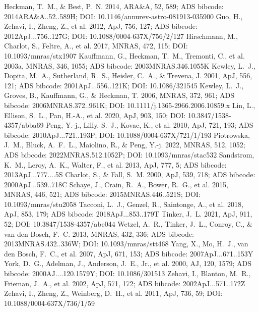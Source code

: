 \documentclass[twocolumn]{aastex631}
\begin{document}
\begin{thebibliography}{}
 Heckman, T.~M., \& Best, P.~N. 2014, ARA\&A, 52, 589; ADS bibcode: 2014ARA&A..52..589H; DOI: 10.1146/annurev-astro-081913-035900
 Guo, H., Zehavi, I., Zheng, Z., et al. 2012, ApJ, 756, 127; ADS bibcode: 2012ApJ...756..127G; DOI: 10.1088/0004-637X/756/2/127
 Hirschmann, M., Charlot, S., Feltre, A., et al. 2017, MNRAS, 472, 115; DOI: 10.1093/mnras/stx1907
 Kauffmann, G., Heckman, T.~M., Tremonti, C., et al. 2003a, MNRAS, 346, 1055; ADS bibcode: 2003MNRAS.346.1055K
 Kewley, L.~J., Dopita, M.~A., Sutherland, R.~S., Heisler, C.~A., \& Trevena, J. 2001, ApJ, 556, 121; ADS bibcode: 2001ApJ...556..121K; DOI: 10.1086/321545
 Kewley, L.~J., Groves, B., Kauffmann, G., \& Heckman, T. 2006, MNRAS, 372, 961; ADS bibcode: 2006MNRAS.372..961K; DOI: 10.1111/j.1365-2966.2006.10859.x
 Lin, L., Ellison, S.~L., Pan, H.-A., et al. 2020, ApJ, 903, 150; DOI: 10.3847/1538-4357/abba69
 Peng, Y.-j., Lilly, S.~J., Kovac, K., et al. 2010, ApJ, 721, 193; ADS bibcode: 2010ApJ...721..193P; DOI: 10.1088/0004-637X/721/1/193
 Piotrowska, J.~M., Bluck, A.~F.~L., Maiolino, R., \& Peng, Y.-j. 2022, MNRAS, 512, 1052; ADS bibcode: 2022MNRAS.512.1052P; DOI: 10.1093/mnras/stac532
 Sandstrom, K.~M., Leroy, A.~K., Walter, F., et al. 2013, ApJ, 777, 5; ADS bibcode: 2013ApJ...777....5S
 Charlot, S., \& Fall, S.~M. 2000, ApJ, 539, 718; ADS bibcode: 2000ApJ...539..718C
 Schaye, J., Crain, R.~A., Bower, R.~G., et al. 2015, MNRAS, 446, 521; ADS bibcode: 2015MNRAS.446..521S; DOI: 10.1093/mnras/stu2058
 Tacconi, L.~J., Genzel, R., Saintonge, A., et al. 2018, ApJ, 853, 179; ADS bibcode: 2018ApJ...853..179T
 Tinker, J.~L. 2021, ApJ, 911, 52; DOI: 10.3847/1538-4357/abe044
 Wetzel, A.~R., Tinker, J.~L., Conroy, C., \& van den Bosch, F.~C. 2013, MNRAS, 432, 336; ADS bibcode: 2013MNRAS.432..336W; DOI: 10.1093/mnras/stt468
 Yang, X., Mo, H.~J., van den Bosch, F.~C., et al. 2007, ApJ, 671, 153; ADS bibcode: 2007ApJ...671..153Y
 York, D.~G., Adelman, J., Anderson, J.~E., Jr., et al. 2000, AJ, 120, 1579; ADS bibcode: 2000AJ....120.1579Y; DOI: 10.1086/301513
 Zehavi, I., Blanton, M.~R., Frieman, J.~A., et al. 2002, ApJ, 571, 172; ADS bibcode: 2002ApJ...571..172Z
 Zehavi, I., Zheng, Z., Weinberg, D.~H., et al. 2011, ApJ, 736, 59; DOI: 10.1088/0004-637X/736/1/59
\end{thebibliography}
\end{document}
